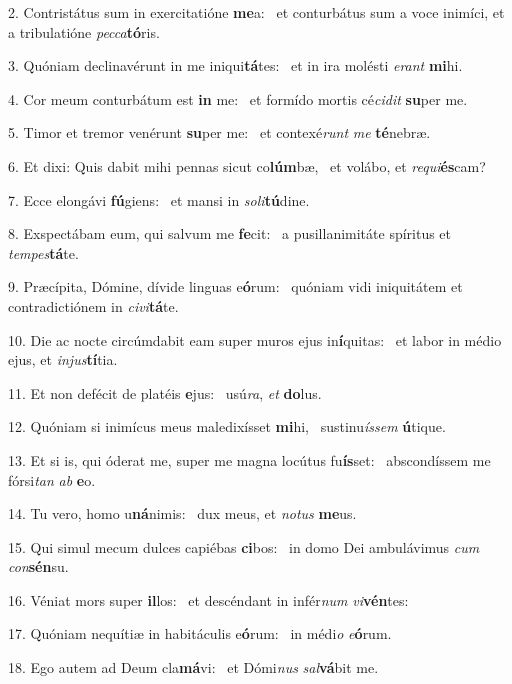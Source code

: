 2. Contristátus sum in exercitatióne \textbf{me}a: \ast\  et conturbátus sum a voce inimíci, et a tribulatióne \textit{pec}\textit{ca}\textbf{tó}ris.\

3. Quóniam declinavérunt in me iniqui\textbf{tá}tes: \ast\  et in ira molésti \textit{e}\textit{rant} \textbf{mi}hi.\

4. Cor meum conturbátum est \textbf{in} me: \ast\  et formído mortis cé\textit{ci}\textit{dit} \textbf{su}per me.\

5. Timor et tremor venérunt \textbf{su}per me: \ast\  et contexé\textit{runt} \textit{me} \textbf{té}nebræ.\

6. Et dixi: Quis dabit mihi pennas sicut co\textbf{lúm}bæ, \ast\  et volábo, et \textit{re}\textit{qui}\textbf{és}cam?\

7. Ecce elongávi \textbf{fú}giens: \ast\  et mansi in \textit{so}\textit{li}\textbf{tú}dine.\

8. Exspectábam eum, qui salvum me \textbf{fe}cit: \ast\  a pusillanimitáte spíritus et \textit{tem}\textit{pes}\textbf{tá}te.\

9. Præcípita, Dómine, dívide linguas e\textbf{ó}rum: \ast\  quóniam vidi iniquitátem et contradictiónem in \textit{ci}\textit{vi}\textbf{tá}te.\

10. Die ac nocte circúmdabit eam super muros ejus in\textbf{í}quitas: \ast\  et labor in médio ejus, et \textit{in}\textit{jus}\textbf{tí}tia.\

11. Et non defécit de platéis \textbf{e}jus: \ast\  usú\textit{ra}, \textit{et} \textbf{do}lus.\

12. Quóniam si inimícus meus maledixísset \textbf{mi}hi, \ast\  sustinu\textit{ís}\textit{sem} \textbf{ú}tique.\

13. Et si is, qui óderat me, super me magna locútus fu\textbf{ís}set: \ast\  abscondíssem me fórsi\textit{tan} \textit{ab} \textbf{e}o.\

14. Tu vero, homo u\textbf{ná}nimis: \ast\  dux meus, et \textit{no}\textit{tus} \textbf{me}us.\

15. Qui simul mecum dulces capiébas \textbf{ci}bos: \ast\  in domo Dei ambulávimus \textit{cum} \textit{con}\textbf{sén}su.\

16. Véniat mors super \textbf{il}los: \ast\  et descéndant in infér\textit{num} \textit{vi}\textbf{vén}tes:\

17. Quóniam nequítiæ in habitáculis e\textbf{ó}rum: \ast\  in médi\textit{o} \textit{e}\textbf{ó}rum.\

18. Ego autem ad Deum cla\textbf{má}vi: \ast\  et Dómi\textit{nus} \textit{sal}\textbf{vá}bit me.\

